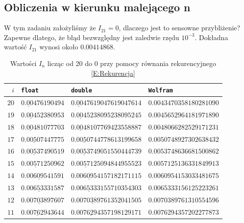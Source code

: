 \documentclass[11pt,leqno]{article}
\begin{document}
\subsection{Obliczenia w kierunku malejącego n}\label{SS:Malejaco}
W tym zadaniu założyliśmy że $I_{21} = 0$, dlaczego jest to sensowne przybliżenie? Zapewne dlatego,
że błąd bezwzględny jest zaledwie rzędu $10^{-3}$. Dokładna wartość $I_{21}$ wynosi około $0.00414868$. \\
\begin{table}[!h]
\renewcommand{\arraystretch}{1.1}
\caption{Wartości $I_{n}$ licząc od 20 do 0 przy pomocy równania rekurencyjnego \eqref{E:Rekurencja}}\label{T:RekurencjaWstecz}
\vspace{-1em}
\begin{center}
    \begin{tabular}{r|l|l|l}
        \texttt{$i$}  &         \texttt{float}      &          \texttt{double}            &    \texttt{Wolfram}     \\ \hline
        $20$          & $\underline{0.004}76190494$ & $\underline{0.004}7619047619047614$ & $0.0043470358180281090$ \\
        $19$          & $\underline{0.0045}2380953$ & $\underline{0.0045}238095238095245$ & $0.0045652964181971890$ \\
        $18$          & $\underline{0.0048}1077703$ & $\underline{0.0048}107769423558887$ & $0.0048066282529171231$ \\
        $17$          & $\underline{0.005074}47775$ & $\underline{0.005074}4778613199658$ & $0.0050748927302638432$ \\
        $16$          & $\underline{0.005374}90519$ & $\underline{0.005374}9051550444739$ & $0.0053748636681500862$ \\
        $15$          & $\underline{0.0057125}0962$ & $\underline{0.0057125}094844955523$ & $0.0057125136331849913$ \\
        $14$          & $\underline{0.006095415}91$ & $\underline{0.006095415}7182171115$ & $0.0060954153033481675$ \\
        $13$          & $\underline{0.006533315}87$ & $\underline{0.006533315}5710354303$ & $0.0065333156125223261$ \\
        $12$          & $\underline{0.007038976}07$ & $\underline{0.00703897613}52041505$ & $0.0070389761310554596$ \\
        $11$          & $\underline{0.00762943}644$ & $\underline{0.0076294357}198129171$ & $0.0076294357202277873$ \\

\end{tabular}
\end{center}
\end{table}
\end{document}
